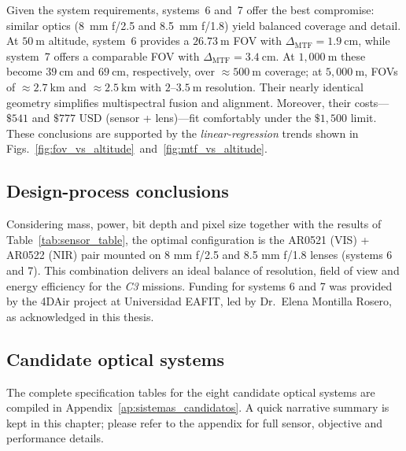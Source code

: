 \noindent Given the system requirements, systems~6 and~7 offer the best
compromise: similar optics (8~mm f/2.5 and 8.5~mm f/1.8) yield balanced
coverage and detail. At \(50~\mathrm{m}\) altitude, system~6 provides a
\(26.73~\mathrm{m}\) FOV with \(\Delta_{\mathrm{MTF}}=1.9~\mathrm{cm}\),
while system~7 offers a comparable FOV with \(\Delta_{\mathrm{MTF}}=3.4~\mathrm{cm}\).
At \(1{,}000~\mathrm{m}\) these become \(39~\mathrm{cm}\) and
\(69~\mathrm{cm}\), respectively, over \(\approx 500~\mathrm{m}\) coverage; at
\(5{,}000~\mathrm{m}\), FOVs of \(\approx 2.7~\mathrm{km}\) and
\(\approx 2.5~\mathrm{km}\) with \(2\text{–}3.5~\mathrm{m}\) resolution.
Their nearly identical geometry simplifies multispectral fusion and alignment.
Moreover, their costs—\(\$541\) and \(\$777\) USD (sensor + lens)—fit
comfortably under the \(\$1{,}500\) limit. These conclusions are supported by
the \emph{linear-regression} trends shown in
Figs.~\ref{fig:fov_vs_altitude}~and~\ref{fig:mtf_vs_altitude}.

\subsection{Design-process conclusions}

Considering mass, power, bit depth and pixel size together with the
results of Table~\ref{tab:sensor_table}, the optimal configuration is
the AR0521 (VIS) + AR0522 (NIR) pair mounted on 8 mm f/2.5 and
8.5 mm f/1.8 lenses (systems 6 and 7). This combination delivers an
ideal balance of resolution, field of view and energy efficiency for the
\textit{C3} missions. Funding for systems 6 and 7 was provided by the
4DAir project at Universidad EAFIT, led by Dr.\ Elena Montilla Rosero, as
acknowledged in this thesis.\\

\subsection{Candidate optical systems}%
\label{sec:candidate_optical_systems} 

The complete specification tables for the eight candidate optical systems are
compiled in Appendix~\ref{ap:sistemas_candidatos}. A quick narrative summary is
kept in this chapter; please refer to the appendix for full sensor, objective
and performance details.
